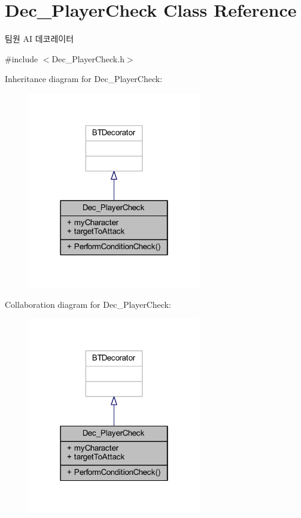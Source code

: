 \hypertarget{class_dec___player_check}{}\section{Dec\+\_\+\+Player\+Check Class Reference}
\label{class_dec___player_check}


팀원 AI 데코레이터  




{\ttfamily \#include $<$Dec\+\_\+\+Player\+Check.\+h$>$}



Inheritance diagram for Dec\+\_\+\+Player\+Check\+:
\nopagebreak
\begin{figure}[H]
\begin{center}
\leavevmode
\includegraphics[width=214pt]{class_dec___player_check__inherit__graph}
\end{center}
\end{figure}


Collaboration diagram for Dec\+\_\+\+Player\+Check\+:
\nopagebreak
\begin{figure}[H]
\begin{center}
\leavevmode
\includegraphics[width=214pt]{class_dec___player_check__coll__graph}
\end{center}
\end{figure}

